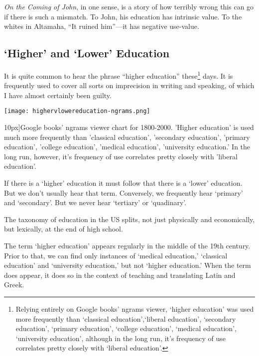 \emph{On the Coming of John}, in one sense, is a story of how terribly wrong this can go if there is such a mismatch. To John, his education has intrinsic value. To the whites in Altamaha, ``It ruined him''---it has negative use-value. 

\subsection{`Higher' and `Lower' Education}
\label{higherandlowereducation}

It is quite common to hear the phrase ``higher education'' these\footnote{Relying entirely on Google books' ngrams viewer, `higher education' was used more frequently than `classical education',`liberal education', `secondary education', `primary education', `college education', `medical education', `university education', although in the long run, it's frequency of use correlates pretty closely with `liberal education'.} days. It is frequently used to cover all sorts on imprecision in writing and speaking, of which I have almost certainly been guilty. \begin{figure*}\texttt{[image: highervlowereducation-ngrams.png]}\caption[Google Ngrams data for 'higher education' versus variants][10px]{Google books' ngrams viewer chart for 1800-2000. 'Higher education' is used much more frequently than 'classical education', 'secondary education', 'primary education', 'college education', 'medical education', 'university education.' In the long run, however, it's frequency of use correlates pretty closely with 'liberal education'.}\label{fig:highereducation}\end{figure*}

If there is a `higher' education it must follow that there is a `lower' education. But we don't usually hear that term. Conversely, we frequently hear `primary' and `secondary'. But we never hear `tertiary' or `quadinary'. 

The taxonomy of education in the US splits, not just physically and economically, but lexically, at the end of high school. 

The term `higher education' appears regularly in the middle of the 19th century. Prior to that, we can find only instances of `medical education,' `classical education' and `university education,' but not `higher education.' When the term does appear, it does so in the context of teaching and translating Latin and Greek.~\citep[p. 662]{Anonymous:1875vz} 

